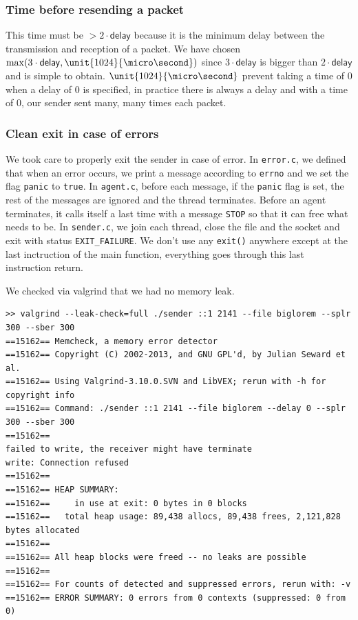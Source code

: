 \documentclass[10pt,a4paper]{article}
\begin{document}
\subsubsection{Time before resending a packet}
This time must be $> 2 \cdot \mathsf{delay}$ because it is the minimum delay between the transmission and reception of a packet.
We have chosen $\max(3 \cdot \mathsf{delay}, \unit{1024}{\micro\second})$ since $3 \cdot \mathsf{delay}$ is bigger than $2 \cdot \mathsf{delay}$ and is simple to obtain.
$\unit{1024}{\micro\second}$ prevent taking a time of 0 when a delay of $0$ is specified,
in practice there is always a delay and with a time of 0, our sender sent many, many times each packet.

\subsubsection{Clean exit in case of errors}
We took care to properly exit the sender in case of error. In \lstinline|error.c|, we defined that when an error occurs, we print a message according to \lstinline|errno|
and we set the flag \lstinline|panic| to \lstinline|true|. In \lstinline|agent.c|, before each message, if the \lstinline|panic| flag is set, the rest of the messages are ignored and the thread terminates.
Before an agent terminates, it calls itself a last time with a message \lstinline|STOP| so that it can free what needs to be.
In \lstinline|sender.c|, we join each thread, close the file and the socket and exit with status \lstinline|EXIT_FAILURE|. We don't use any \texttt{exit()} anywhere except at the last inctruction of the main function, everything goes through this last instruction return.

We checked via valgrind that we had no memory leak.
\begin{lstlisting}[basicstyle=\ttfamily, basicstyle=\scriptsize]
>> valgrind --leak-check=full ./sender ::1 2141 --file biglorem --splr 300 --sber 300
==15162== Memcheck, a memory error detector
==15162== Copyright (C) 2002-2013, and GNU GPL'd, by Julian Seward et al.
==15162== Using Valgrind-3.10.0.SVN and LibVEX; rerun with -h for copyright info
==15162== Command: ./sender ::1 2141 --file biglorem --delay 0 --splr 300 --sber 300
==15162==
failed to write, the receiver might have terminate
write: Connection refused
==15162==
==15162== HEAP SUMMARY:
==15162==     in use at exit: 0 bytes in 0 blocks
==15162==   total heap usage: 89,438 allocs, 89,438 frees, 2,121,828 bytes allocated
==15162==
==15162== All heap blocks were freed -- no leaks are possible
==15162==
==15162== For counts of detected and suppressed errors, rerun with: -v
==15162== ERROR SUMMARY: 0 errors from 0 contexts (suppressed: 0 from 0)
\end{lstlisting}
\end{document}
